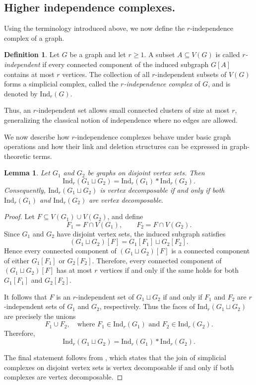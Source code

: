 \documentclass[12pt,reqno]{amsart}
\newtheorem{lemma}[theorem]{Lemma}
\theoremstyle{definition}
\newtheorem{definition}[theorem]{Definition}
\def\Ind{\mathrm{Ind}}
\begin{document}
\subsection{Higher independence complexes.}

Using the terminology introduced above, we now define the $r$-independence complex of a graph.

\begin{definition}\label{def: r-ind complex}
Let $G$ be a graph and let $r \ge 1$. A subset $A \subseteq V(G)$ is called \emph{$r$-independent} if every connected component of the induced subgraph $G[A]$ contains at most $r$ vertices. The collection of all $r$-independent subsets of $V(G)$ forms a simplicial complex, called the \emph{$r$-independence complex} of $G$, and is denoted by $\Ind_r(G)$.
\end{definition}

Thus, an $r$-independent set allows small connected clusters of size at most $r$, generalizing the classical notion of independence where no edges are allowed.

We now describe how $r$-independence complexes behave under basic graph operations and how their link and deletion structures can be expressed in graph-theoretic terms.


\begin{lemma}\label{lem: disjoint union}
Let $G_1$ and $G_2$ be graphs on disjoint vertex sets. Then
\[
\Ind_r(G_1 \sqcup G_2)=\Ind_r(G_1)*\Ind_r(G_2).
\]
Consequently, $\Ind_r(G_1 \sqcup G_2)$ is vertex decomposable if and only if both $\Ind_r(G_1)$ and $\Ind_r(G_2)$ are vertex decomposable.
\end{lemma}
\begin{proof}
Let $F \subseteq V(G_1)\cup V(G_2)$, and define
\[
F_1 = F \cap V(G_1),
\qquad
F_2 = F \cap V(G_2).
\]
Since $G_1$ and $G_2$ have disjoint vertex sets, the induced subgraph satisfies
\[
(G_1\sqcup G_2)[F]
=
G_1[F_1]\sqcup G_2[F_2].
\]
Hence every connected component of $(G_1\sqcup G_2)[F]$ is a connected component of either $G_1[F_1]$ or $G_2[F_2]$. Therefore, every connected component of $(G_1\sqcup G_2)[F]$ has at most $r$ vertices if and only if the same holds for both $G_1[F_1]$ and $G_2[F_2]$.

It follows that $F$ is an $r$-independent set of $G_1\sqcup G_2$ if and only if $F_1$ and $F_2$ are $r$-independent sets of $G_1$ and $G_2$, respectively. Thus the faces of $\Ind_r(G_1\sqcup G_2)$ are precisely the unions
\[
F_1\cup F_2,
\quad
\text{where }
F_1\in \Ind_r(G_1)
\text{ and }
F_2\in \Ind_r(G_2).
\]
Therefore,
\[
\Ind_r(G_1\sqcup G_2)
=
\Ind_r(G_1)*\Ind_r(G_2).
\]

The final statement follows from \cite[Theorem 3.30]{JJonsson08}, which states that the join of simplicial complexes on disjoint vertex sets is vertex decomposable if and only if both complexes are vertex decomposable.
\end{proof}
\end{document}
